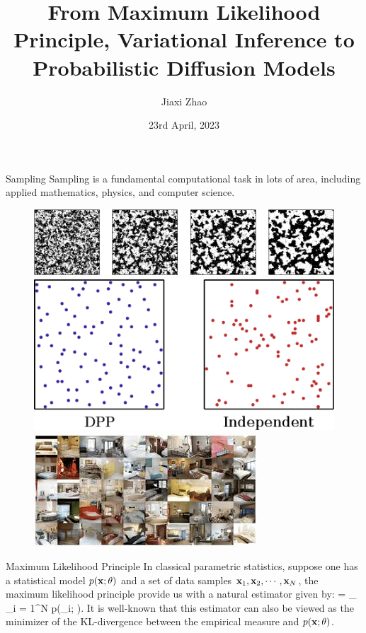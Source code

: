 \documentclass{beamer}
\title[DDPM]{From Maximum Likelihood Principle, Variational Inference to Probabilistic Diffusion Models}
\author[J. Zhao]{Jiaxi Zhao}
\date{23rd April, 2023}
\begin{document}
\par \setlength{\parindent}{2em}

\begin{frame}
\titlepage

\end{frame}


\begin{frame}{Sampling}
	Sampling is a fundamental computational task in lots of area, including applied mathematics, physics, and computer science.
	\begin{figure}[H]
          \centering
          \centerline{\includegraphics[width=0.7\linewidth]{fig/ising.png}}
          \centerline{\includegraphics[width=0.5\linewidth]{fig/DPP.png}}
          \centerline{\includegraphics[width=0.5\linewidth]{fig/GAN.jpeg}}
        \end{figure}
\end{frame}


\begin{frame}{Maximum Likelihood Principle}
	In classical parametric statistics, suppose one has a statistical model $p(\mathbf{x}; \theta)$ and a set of data samples $\mathbf{x}_1, \mathbf{x}_2, \cdots, \mathbf{x}_N$, the maximum likelihood principle provide us with a natural estimator given by:
	\bequn
		\wht\theta = \arg\max_{\theta} \log \prod_{i = 1}^N p(\mfx_i; \theta).
	\eequn
	It is well-known that this estimator can also be viewed as the minimizer of the KL-divergence between the empirical measure and $p(\mathbf{x}; \theta)$.
\end{frame}
\end{document}
